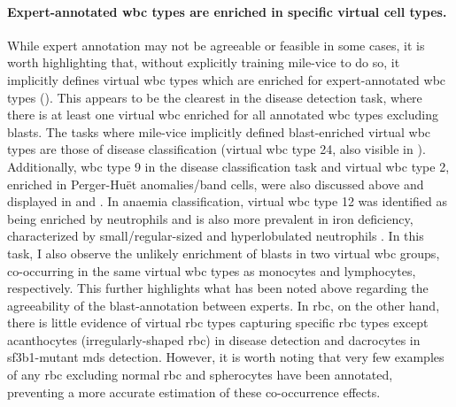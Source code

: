 \begin{figure}[!ht]
    \label{fig:annotated-wbc-rate-test}
\end{figure}

\paragraph{Expert-annotated \ac{wbc} types are enriched in specific virtual cell types.} While expert annotation may not be agreeable or feasible in some cases, it is worth highlighting that, without explicitly training \ac{mile-vice} to do so, it implicitly defines virtual \ac{wbc} types which are enriched for expert-annotated \ac{wbc} types (). This appears to be the clearest in the disease detection task, where there is at least one virtual \ac{wbc} enriched for all annotated \ac{wbc} types excluding blasts. The tasks where \ac{mile-vice} implicitly defined blast-enriched virtual \ac{wbc} types are those of disease classification (virtual \ac{wbc} type 24, also visible in ). Additionally, \ac{wbc} type 9 in the disease classification task and virtual \ac{wbc} type 2, enriched in Perger-Huët anomalies/band cells, were also discussed above and displayed in  and . In anaemia classification, virtual \ac{wbc} type 12 was identified as being enriched by neutrophils and is also more prevalent in iron deficiency, characterized by small/regular-sized and hyperlobulated neutrophils . In this task, I also observe the unlikely enrichment of blasts in two virtual \ac{wbc} groups, co-occurring in the same virtual \ac{wbc} types as monocytes and lymphocytes, respectively. This further highlights what has been noted above regarding the agreeability of the blast-annotation between experts. In \ac{rbc}, on the other hand, there is little evidence of virtual \ac{rbc} types capturing specific \ac{rbc} types except acanthocytes (irregularly-shaped \ac{rbc}) in disease detection and dacrocytes in \ac{sf3b1}-mutant \ac{mds} detection. However, it is worth noting that very few examples of any \ac{rbc} excluding normal \ac{rbc} and spherocytes have been annotated, preventing a more accurate estimation of these co-occurrence effects.

